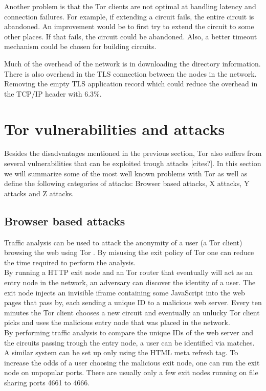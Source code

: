 \documentclass[journal]{IEEEtran}
\begin{document}
		Another problem is that the Tor clients are not optimal at handling latency and connection failures. For example, if extending a circuit fails, the entire circuit is abandoned. An improvement would be to first try to extend the circuit to some other places. If that fails, the circuit could be abandoned. Also, a better timeout mechanism could be chosen for building circuits.		
		
		Much of the overhead of the network is in downloading the directory information. There is also overhead in the TLS connection between the nodes in the network. Removing the empty TLS application record which could reduce the overhead in the TCP/IP header with 6.3\%.
		
	\section{Tor vulnerabilities and attacks}
Besides the disadvantages mentioned in the previous section, Tor also suffers from several vulnerabilities that can be exploited trough attacks [cites?]. In this section we will summarize some of the most well known problems with Tor as well as define the following categories of attacks: Browser based attacks, X attacks, Y attacks and Z attacks.

		\subsection{Browser based attacks}
		Traffic analysis can be used to attack the anonymity of a user (a Tor client) browsing the web using Tor \cite{abbott2007browser}. By misusing the exit policy of Tor one can reduce the time required to perform the analysis.\\

		By running a HTTP exit node and an Tor router that eventually will act as an entry node in the network, an adversary can discover the identity of a user. The exit node injects an invisible iframe containing some JavaScript into the web pages that pass by, each sending a unique ID to a malicious web server. Every ten minutes the Tor client chooses a new circuit and eventually an unlucky Tor client picks and uses the malicious entry node that was placed in the network.\\

		By performing traffic analysis to compare the unique IDs of the web server and the circuits passing trough the entry node, a user can be identified via matches. A similar system can be set up only using the HTML meta refresh tag. To increase the odds of a user choosing the malicious exit node, one can run the exit node on unpopular ports. There are usually only a few exit nodes running on file sharing ports 4661 to 4666.\\
\end{document}
